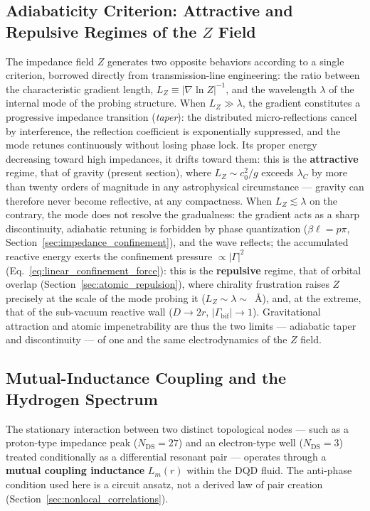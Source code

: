 \documentclass[11pt,a4paper]{article}
\theoremstyle{plain}
\theoremstyle{remark}
\newcommand{\Ncd}{\ensuremath{N_{\mathrm{DS}}}}
\begin{document}
\subsection{Adiabaticity Criterion: Attractive and Repulsive Regimes of the $Z$ Field}
\label{sec:adiabaticity}
The impedance field $Z$ generates two opposite behaviors according to a single criterion, borrowed directly from transmission-line engineering: the ratio between the characteristic gradient length, $L_Z \equiv |\nabla \ln Z|^{-1}$, and the wavelength $\lambda$ of the internal mode of the probing structure. When $L_Z \gg \lambda$, the gradient constitutes a progressive impedance transition (\emph{taper}): the distributed micro-reflections cancel by interference, the reflection coefficient is exponentially suppressed, and the mode retunes continuously without losing phase lock. Its proper energy decreasing toward high impedances, it drifts toward them: this is the \textbf{attractive} regime, that of gravity (present section), where $L_Z \sim c_0^2/g$ exceeds $\lambda_C$ by more than twenty orders of magnitude in any astrophysical circumstance --- gravity can therefore never become reflective, at any compactness. When $L_Z \lesssim \lambda$ on the contrary, the mode does not resolve the gradualness: the gradient acts as a sharp discontinuity, adiabatic retuning is forbidden by phase quantization ($\beta\ell = p\pi$, Section~\ref{sec:impedance_confinement}), and the wave reflects; the accumulated reactive energy exerts the confinement pressure $\propto|\Gamma|^2$ (Eq.~\eqref{eq:linear_confinement_force}): this is the \textbf{repulsive} regime, that of orbital overlap (Section~\ref{sec:atomic_repulsion}), where chirality frustration raises $Z$ precisely at the scale of the mode probing it ($L_Z \sim \lambda \sim$~\AA), and, at the extreme, that of the sub-vacuum reactive wall ($D \to 2r$, $|\Gamma_{\text{bif}}| \to 1$). Gravitational attraction and atomic impenetrability are thus the two limits --- adiabatic taper and discontinuity --- of one and the same electrodynamics of the $Z$ field.

\subsection{Mutual-Inductance Coupling and the Hydrogen Spectrum}
The stationary interaction between two distinct topological nodes --- such as a proton-type impedance peak ($\Ncd=27$) and an electron-type well ($\Ncd=3$) treated conditionally as a differential resonant pair --- operates through a \textbf{mutual coupling inductance} $L_m(r)$ within the DQD fluid. The anti-phase condition used here is a circuit ansatz, not a derived law of pair creation (Section~\ref{sec:nonlocal_correlations}).
\end{document}
